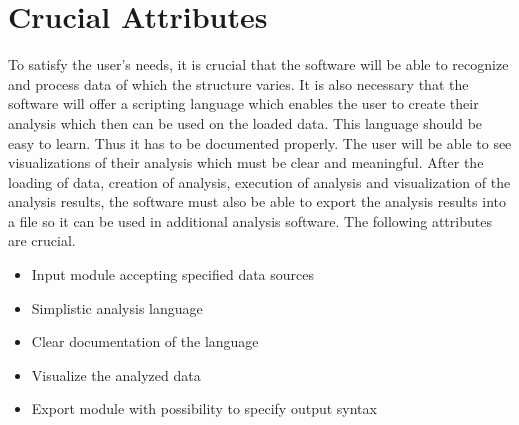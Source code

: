 \documentclass[a4paper]{article}
\begin{document}
\section{Crucial Attributes}
To satisfy the user's needs, it is crucial that the software will be able to recognize and process data of which the structure varies. It is also necessary that the software will offer a scripting language which enables the user to create their analysis which then can be used on the loaded data. This language should be easy to learn. Thus it has to be documented properly. The user will be able to see visualizations of their analysis which must be clear and meaningful. After the loading of data, creation of analysis, execution of analysis and visualization of the analysis results, the software must also be able to export the analysis results into a file so it can be used in additional analysis software. The following attributes are crucial.
\begin{itemize}
\item Input module accepting specified data sources
\item Simplistic analysis language
\item Clear documentation of the language
\item Visualize the analyzed data
\item Export module with possibility to specify output syntax
\end{itemize}
\end{document}
